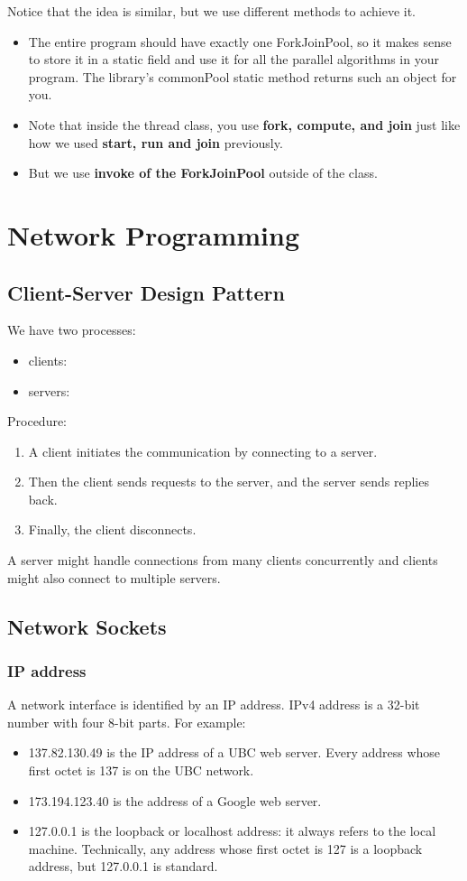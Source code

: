 \documentclass[letterpaper,12pt]{article}
\begin{document}
Notice that the idea is similar, but we use different methods to achieve it.

\begin{itemize}
      \item The entire program should have exactly one ForkJoinPool, so it makes sense to store it in a static field and use it for all the parallel algorithms in your program. The library's commonPool static method returns such an object for you.
      \item Note that inside the thread class, you use \textbf{fork, compute, and join} just like how we used \textbf{start, run and join} previously.
      \item But we use \textbf{invoke of the ForkJoinPool} outside of the class.
\end{itemize}

\section{Network Programming}
\subsection{Client-Server Design Pattern}
We have two processes:\begin{itemize}
      \item clients:
      \item servers:
\end{itemize}
Procedure: \begin{enumerate}
      \item A client initiates the communication by connecting to a server.
      \item Then the client sends requests to the server, and the server sends replies back.
      \item Finally, the client disconnects.
\end{enumerate}
A server might handle connections from many clients concurrently and clients might also connect to multiple servers.

\subsection{Network Sockets}
\subsubsection{IP address}
A network interface is identified by an IP address. IPv4 address is a 32-bit number with four 8-bit parts. For example:\begin{itemize}
      \item 137.82.130.49 is the IP address of a UBC web server. Every address whose first octet is 137 is on the UBC network.
      \item 173.194.123.40 is the address of a Google web server.
      \item 127.0.0.1 is the loopback or localhost address: it always refers to the local machine. Technically, any address whose first octet is 127 is a loopback address, but 127.0.0.1 is standard.
\end{itemize}
\end{document}
